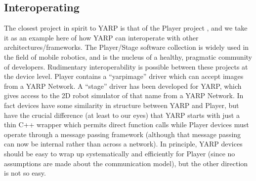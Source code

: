 








\subsection{Interoperating}

The closest project in spirit to YARP is that of the Player project
\cite{vaughan2006reusable}, and we take it as an example here of
how YARP can interoperate with other architectures/frameworks.
The Player/Stage software collection is 
widely used in the field of mobile robotics, and is the nucleus of
a healthy, pragmatic community of developers.  
%
Rudimentary interoperability is possible between these projects
at the device level.
Player contains a ``yarpimage'' driver which can accept images
from a YARP Network.  A ``stage'' driver has been developed
for YARP, which gives access to the 2D robot simulator of that
name from a YARP Network.
%
In fact devices have some similarity in structure between YARP and
Player, but have the crucial difference (at least to our eyes) that
YARP starts with just a thin C++ wrapper which permits direct function
calls while Player devices must operate through a message passing
framework (although that message passing can now be internal rather
than across a network).
%
In principle, YARP devices should be easy to wrap up systematically
and efficiently for Player (since no assumptions are made about the
communication model), but the other direction is not so easy.
%

